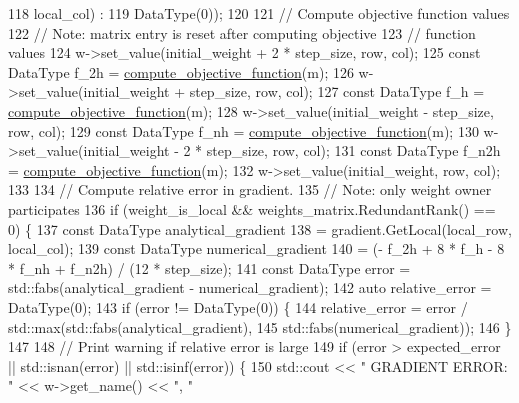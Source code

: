 \begin{DoxyCode}
118                                                                  local\_col) :
119                                          DataType(0));
120 
121         \textcolor{comment}{// Compute objective function values}
122         \textcolor{comment}{// Note: matrix entry is reset after computing objective}
123         \textcolor{comment}{// function values}
124         w->set\_value(initial\_weight + 2 * step\_size, row, col);
125         \textcolor{keyword}{const} DataType f\_2h = \hyperlink{classlbann_1_1lbann__callback__gradient__check_a54ba40dd3b381d5c889d77edeffa37f9}{compute\_objective\_function}(m);
126         w->set\_value(initial\_weight + step\_size, row, col);
127         \textcolor{keyword}{const} DataType f\_h = \hyperlink{classlbann_1_1lbann__callback__gradient__check_a54ba40dd3b381d5c889d77edeffa37f9}{compute\_objective\_function}(m);
128         w->set\_value(initial\_weight - step\_size, row, col);
129         \textcolor{keyword}{const} DataType f\_nh = \hyperlink{classlbann_1_1lbann__callback__gradient__check_a54ba40dd3b381d5c889d77edeffa37f9}{compute\_objective\_function}(m);
130         w->set\_value(initial\_weight - 2 * step\_size, row, col);
131         \textcolor{keyword}{const} DataType f\_n2h = \hyperlink{classlbann_1_1lbann__callback__gradient__check_a54ba40dd3b381d5c889d77edeffa37f9}{compute\_objective\_function}(m);
132         w->set\_value(initial\_weight, row, col);
133 
134         \textcolor{comment}{// Compute relative error in gradient.}
135         \textcolor{comment}{// Note: only weight owner participates}
136         \textcolor{keywordflow}{if} (weight\_is\_local && weights\_matrix.RedundantRank() == 0) \{
137           \textcolor{keyword}{const} DataType analytical\_gradient
138             = gradient.GetLocal(local\_row, local\_col);
139           \textcolor{keyword}{const} DataType numerical\_gradient
140             = (- f\_2h + 8 * f\_h - 8 * f\_nh + f\_n2h) / (12 * step\_size);
141           \textcolor{keyword}{const} DataType error = std::fabs(analytical\_gradient - numerical\_gradient);
142           \textcolor{keyword}{auto} relative\_error = DataType(0);
143           \textcolor{keywordflow}{if} (error != DataType(0)) \{
144             relative\_error = error / std::max(std::fabs(analytical\_gradient),
145                                               std::fabs(numerical\_gradient));
146           \}
147         
148           \textcolor{comment}{// Print warning if relative error is large}
149           \textcolor{keywordflow}{if} (error > expected\_error || std::isnan(error) || std::isinf(error)) \{
150             std::cout << \textcolor{stringliteral}{"  GRADIENT ERROR: "} << w->get\_name() << \textcolor{stringliteral}{", "}

\end{DoxyCode}
